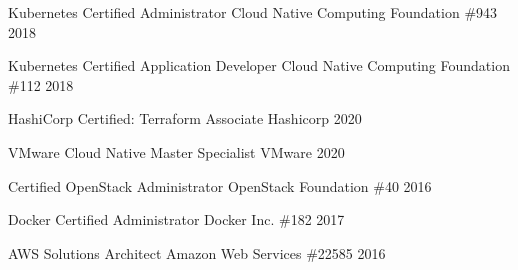 

\begin{cvhonors}

\cvhonor
    {Kubernetes Certified Administrator}
    {Cloud Native Computing Foundation}
    {\#943}
    {2018} %

  \cvhonor
    {Kubernetes Certified Application Developer}
    {Cloud Native Computing Foundation}
    {\#112}
    {2018} %

\cvhonor
    {HashiCorp Certified: Terraform Associate}
    {Hashicorp}
    {}
    {2020} %

\cvhonor
    {VMware Cloud Native Master Specialist}
    {VMware}
    {}
    {2020} %

  \cvhonor
    {Certified OpenStack Administrator}
    {OpenStack Foundation}
    {\#40}
    {2016} %

  \cvhonor
    {Docker Certified Administrator}
    {Docker Inc.}
    {\#182}
    {2017} %

  \cvhonor
    {AWS Solutions Architect}
    {Amazon Web Services}
    {\#22585}
    {2016} %


\end{cvhonors}
